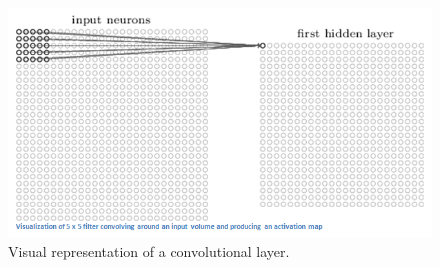 \begin{figure}[htbp]
\begin{center}
\includegraphics[width=\textwidth]{immagini/pictures/ActivationMap.png} 
\caption{Visual representation of a convolutional layer.}
\end{center}
\end{figure}

